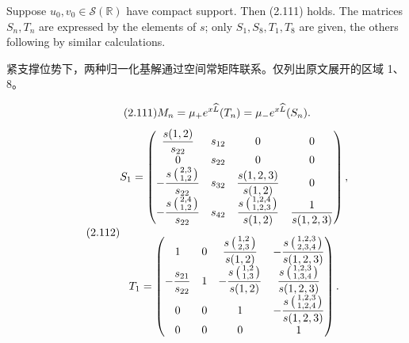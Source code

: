 \begin{paperlemmaen}
Suppose $u_0,v_0\in\mathcal S(\mathbb R)$ have compact support. Then (2.111) holds. The matrices $S_n,T_n$ are expressed by the elements of $s$; only $S_1,S_8,T_1,T_8$ are given, the others following by similar calculations.
\end{paperlemmaen}
\begin{paperlemmacn*}
紧支撑位势下，两种归一化基解通过空间常矩阵联系。仅列出原文展开的区域 1、8。
\end{paperlemmacn*}
\begin{equation}\originaleq{2.111}
M_n=\mu_+e^{x\widehat L}(T_n)=\mu_-e^{x\widehat L}(S_n).
\end{equation}
\begin{equation}\originaleq{2.112}
\begin{gathered}
S_1=\begin{pmatrix}
\dfrac{s(1,2)}{s_{22}}&s_{12}&0&0\\
0&s_{22}&0&0\\
-\dfrac{s\left(\begin{smallmatrix}2,3\\1,2\end{smallmatrix}\right)}{s_{22}}&s_{32}&\dfrac{s(1,2,3)}{s(1,2)}&0\\
-\dfrac{s\left(\begin{smallmatrix}2,4\\1,2\end{smallmatrix}\right)}{s_{22}}&s_{42}&\dfrac{s\left(\begin{smallmatrix}1,2,4\\1,2,3\end{smallmatrix}\right)}{s(1,2)}&\dfrac{1}{s(1,2,3)}
\end{pmatrix},\\[5pt]
T_1=\begin{pmatrix}
1&0&\dfrac{s\left(\begin{smallmatrix}1,2\\2,3\end{smallmatrix}\right)}{s(1,2)}&-\dfrac{s\left(\begin{smallmatrix}1,2,3\\2,3,4\end{smallmatrix}\right)}{s(1,2,3)}\\
-\dfrac{s_{21}}{s_{22}}&1&-\dfrac{s\left(\begin{smallmatrix}1,2\\1,3\end{smallmatrix}\right)}{s(1,2)}&\dfrac{s\left(\begin{smallmatrix}1,2,3\\1,3,4\end{smallmatrix}\right)}{s(1,2,3)}\\
0&0&1&-\dfrac{s\left(\begin{smallmatrix}1,2,3\\1,2,4\end{smallmatrix}\right)}{s(1,2,3)}\\
0&0&0&1
\end{pmatrix}.
\end{gathered}
\end{equation}
